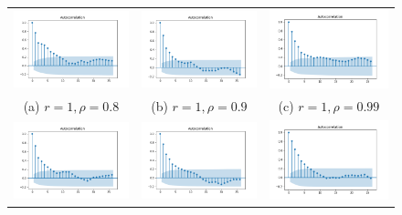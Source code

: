 \begin{figure}
    \centering
    \begin{tabular}{ccc}
        \includegraphics[width=50mm]{autocor/1_0_0.8_1614784150.46764}   & \includegraphics[width=50mm]{autocor/1_0_0.9_1614789195.7596514}
        & \includegraphics[width=50mm]{autocor/1_0_0.99_1614794552.4804938}\\
        (a) $r = 1, \rho = 0.8$                                          & (b) $r = 1, \rho = 0.9$                                          & (c) $r = 1, \rho = 0.99$ \\[6pt]
        \includegraphics[width=50mm]{autocor/2_0_0.8_1614786651.7051768} & \includegraphics[width=50mm]{autocor/2_0_0.9_1614791739.9236946}
        & \includegraphics[width=50mm]{autocor/2_0_0.99_1614797400.487133}\\

\end{tabular}
\end{figure}
